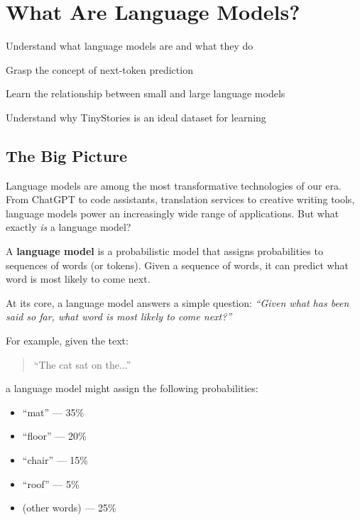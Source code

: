 \chapter{What Are Language Models?}
\label{ch:what-are-lms}

\begin{objectives}
    \item Understand what language models are and what they do
    \item Grasp the concept of next-token prediction
    \item Learn the relationship between small and large language models
    \item Understand why TinyStories is an ideal dataset for learning
\end{objectives}

\section{The Big Picture}

Language models are among the most transformative technologies of our era. From ChatGPT to code assistants, translation services to creative writing tools, language models power an increasingly wide range of applications. But what exactly \textit{is} a language model?

\begin{definition}[title=Language Model]
A \textbf{language model} is a probabilistic model that assigns probabilities to sequences of words (or tokens). Given a sequence of words, it can predict what word is most likely to come next.
\end{definition}

At its core, a language model answers a simple question: \textit{``Given what has been said so far, what word is most likely to come next?''}

For example, given the text:
\begin{quote}
    ``The cat sat on the...''
\end{quote}
a language model might assign the following probabilities:
\begin{itemize}
    \item ``mat'' --- 35\%
    \item ``floor'' --- 20\%
    \item ``chair'' --- 15\%
    \item ``roof'' --- 5\%
    \item (other words) --- 25\%
\end{itemize}


